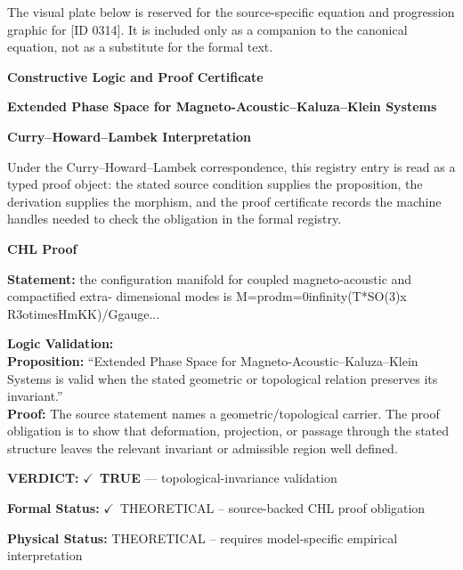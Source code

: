 \begingroup\footnotesize\sloppy
The visual plate below is reserved for the source-specific equation and progression graphic for [ID 0314]. It is included only as a companion to the canonical equation, not as a substitute for the formal text.
\par\endgroup
\ifTZPDarkEdition
{}
\fi

\clearpage
\begingroup\tzpsupportsetup
\noindent\textbf{\fontsize{10.8pt}{12.8pt}\selectfont [ID 0314] Constructive Logic and Proof Certificate}\par
\noindent\textbf{\fontsize{10pt}{12pt}\selectfont Extended Phase Space for Magneto-Acoustic--Kaluza--Klein Systems}\par
\vspace{0.45em}
\begingroup
\footnotesize
\setlength{\parskip}{0.22em}
\setlength{\parindent}{0pt}
\noindent\textbf{Curry--Howard--Lambek Interpretation}\par
Under the Curry--Howard--Lambek correspondence, this registry entry is read as a typed proof
object: the stated source condition supplies the proposition, the derivation supplies the
morphism, and the proof certificate records the machine handles needed to check the obligation
in the formal registry.

\vspace{0.45em}
\noindent\textbf{CHL Proof}\par
\textbf{Statement:} the configuration manifold for coupled magneto-acoustic and compactified extra-
dimensional modes is M=prodm=0infinity(T*SO(3)x R3otimesHmKK)/Ggauge...

\textbf{Logic Validation:}\\
\textbf{Proposition:} ``Extended Phase Space for Magneto-Acoustic--Kaluza--Klein Systems is valid when the
stated geometric or topological relation preserves its invariant.''\\
\textbf{Proof:} The source statement names a geometric/topological carrier. The proof obligation is to
show that deformation, projection, or passage through the stated structure leaves the
relevant invariant or admissible region well defined.

\textbf{VERDICT:} \ensuremath{\checkmark}\ \textbf{TRUE} --- topological-invariance validation

\textbf{Formal Status:} \ensuremath{\checkmark}\ THEORETICAL -- source-backed CHL proof obligation

\textbf{Physical Status:} THEORETICAL -- requires model-specific empirical interpretation
\par\vspace{0.45em}
\par
\ifTZPDarkEdition
{}
\fi
\endgroup
\endgroup
